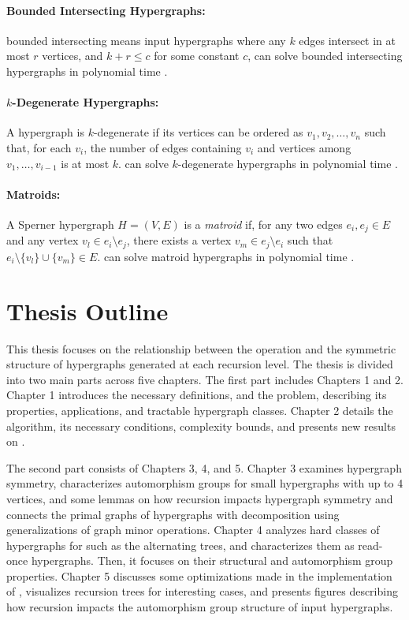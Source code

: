 \paragraph{Bounded Intersecting Hypergraphs:} bounded intersecting means input hypergraphs where any $k$ edges intersect in at most $r$ vertices, and $k+r\leq c$ for some constant $c$, \TransHyp{} can solve bounded intersecting hypergraphs in polynomial time \cite{KBEG06}.

\paragraph{$k$-Degenerate Hypergraphs:} A hypergraph is $k$-degenerate if its vertices can be ordered as $v_1,v_2,\dots,v_n$ such that, for each $v_i$, the number of edges containing $v_i$ and vertices among $v_1,\dots,v_{i-1}$ is at most $k$. \TransHyp{} can solve $k$-degenerate hypergraphs in polynomial time \cite{EGM03}.

\paragraph{Matroids:} A Sperner hypergraph $H=(V,E)$ is a \emph{matroid} if, for any two edges $e_i,e_j\in E$ and any vertex $v_l\in e_i\setminus e_j$, there exists a vertex $v_m\in e_j\setminus e_i$ such that $e_i\setminus\{v_l\}\cup\{v_m\}\in E$. \TransHyp{} can solve matroid hypergraphs in polynomial time \cite{Ber87}.

\section{Thesis Outline}

This thesis focuses on the relationship between the \FKA{} operation and the symmetric structure of hypergraphs generated at each recursion level. The thesis is divided into two main parts across five chapters. The first part includes Chapters 1 and 2. Chapter 1 introduces the necessary definitions, and the \TransHyp{} problem, describing its properties, applications, and tractable hypergraph classes. Chapter 2 details the \FKA{} algorithm, its necessary conditions, complexity bounds, and presents new results on \TransHyp.

The second part consists of Chapters 3, 4, and 5. Chapter 3 examines hypergraph symmetry, characterizes automorphism groups for small hypergraphs with up to 4 vertices, and some lemmas on how \FKA{} recursion impacts hypergraph symmetry and connects the primal graphs of hypergraphs with \FKA{} decomposition using generalizations of graph minor operations. Chapter 4 analyzes hard classes of hypergraphs for \FKA{} such as the alternating trees, and characterizes them as read-once hypergraphs. Then, it focuses on their structural and automorphism group properties. Chapter 5 discusses some optimizations made in the implementation of \FKA, visualizes recursion trees for interesting cases, and presents figures describing how recursion impacts the automorphism group structure of input hypergraphs.

